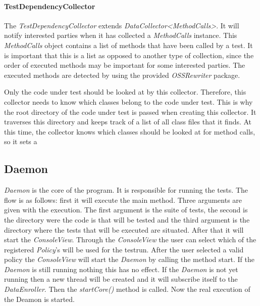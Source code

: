 \documentclass[i2]{oss}
\newcommand{\class}[1]{\emph{#1}}
\newcommand{\method}[1]{\emph{#1}}
\begin{document}
\paragraph{TestDependencyCollector}

The \class{TestDependencyCollector} extends \class{DataCollector<MethodCalls>}.
It will notify interested parties when it has collected a \class{MethodCalls} instance.
This \class{MethodCalls} object contains a list of methods that have been called by a test.
It is important that this is a list as opposed to another type of collection, since the order of executed methods may be important for some interested parties.
The executed methods are detected by using the provided \class{OSSRewriter} package.

Only the code under test should be looked at by this collector.
Therefore, this collector needs to know which classes belong to the code under test.
This is why the root directory of the code under test is passed when creating this collector.
It traverses this directory and keeps track of a list of all class files that it finds.
At this time, the collector knows which classes should be looked at for method calls, so it sets a




\subsection{Daemon}
\label{subssec: deamon}

\class{Daemon} is the core of the program. %
It is responsible for running the tests. The flow is as follows: first it will execute the main method. %
Three arguments are given with the execution. The first argument is the suite of tests, the second is the directory were the code is that will be tested and the third argument is the directory where the tests that will be executed are situated. After that it will start the \class{ConsoleView}. Through the \class{ConsoleView} the user can select which of the registered \class{Policy}'s will be used for the testrun. After the user selected a valid policy the \class{ConsoleView} will start the \class{Daemon} by calling the method start. If the \class{Daemon} is still running nothing this has no effect. If the \class{Daemon} is not yet running then a new thread will be created and it will subscribe itself to the \class{DataEnroller}. 
Then the \method{startCore()} method is called. Now the real execution of the Deamon is started.
\end{document}
